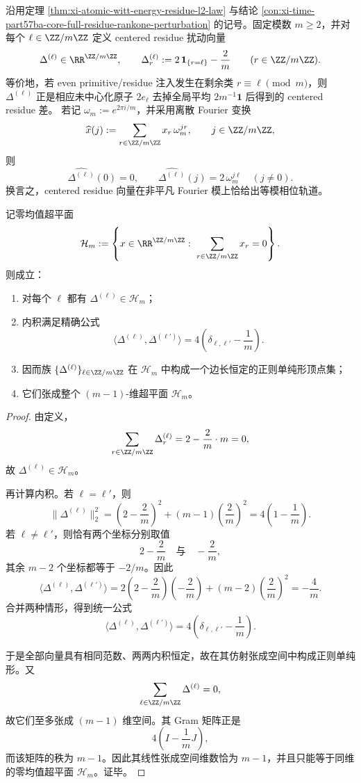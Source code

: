 \begin{theorem}\label{thm:xi-time-part65c-atomic-centered-residue-simplex}
沿用定理 \ref{thm:xi-atomic-witt-energy-residue-l2-law} 与结论 \ref{con:xi-time-part57ba-core-full-residue-rankone-perturbation} 的记号。固定模数 \(m\ge 2\)，并对每个 \(\ell\in \ZZ/m\ZZ\) 定义 centered residue 扰动向量
\[
\Delta^{(\ell)}\in\RR^{\ZZ/m\ZZ},
\qquad
\Delta^{(\ell)}_r:=2\,\mathbf 1_{\{r=\ell\}}-\frac{2}{m}
\qquad (r\in\ZZ/m\ZZ).
\]
等价地，若 even primitive/residue 注入发生在剩余类 \(r\equiv \ell\pmod m\)，则 \(\Delta^{(\ell)}\) 正是相应未中心化原子 \(2e_\ell\) 去掉全局平均 \(2m^{-1}\mathbf 1\) 后得到的 centered residue 差。
若记 \(\omega_m:=e^{2\pi i/m}\)，并采用离散 Fourier 变换
\[
\widehat x(j):=\sum_{r\in\ZZ/m\ZZ}x_r\,\omega_m^{jr},
\qquad j\in\ZZ/m\ZZ,
\]
则
\[
\widehat{\Delta^{(\ell)}}(0)=0,
\qquad
\widehat{\Delta^{(\ell)}}(j)=2\,\omega_m^{j\ell}
\quad (j\neq 0).
\]
换言之，centered residue 向量在非平凡 Fourier 模上恰给出等模相位轨道。

记零均值超平面
\[
\mathcal H_m:=\left\{x\in\RR^{\ZZ/m\ZZ}:\ \sum_{r\in\ZZ/m\ZZ}x_r=0\right\}.
\]
则成立：
\begin{enumerate}
  \item 对每个 \(\ell\) 都有 \(\Delta^{(\ell)}\in\mathcal H_m\)；
  \item 内积满足精确公式
  \[
  \boxed{\;
  \bigl\langle \Delta^{(\ell)},\Delta^{(\ell')}\bigr\rangle
  =
  4\left(\delta_{\ell,\ell'}-\frac{1}{m}\right).\;}
  \]
  \item 因而族 \(\{\Delta^{(\ell)}\}_{\ell\in\ZZ/m\ZZ}\) 在 \(\mathcal H_m\) 中构成一个边长恒定的正则单纯形顶点集；
  \item 它们张成整个 \((m-1)\)-维超平面 \(\mathcal H_m\)。
\end{enumerate}
\end{theorem}
\begin{proof}
由定义，
\[
\sum_{r\in\ZZ/m\ZZ}\Delta_r^{(\ell)}
=
2-\frac{2}{m}\cdot m
=
0,
\]
故 \(\Delta^{(\ell)}\in\mathcal H_m\)。

再计算内积。若 \(\ell=\ell'\)，则
\[
\bigl\|\Delta^{(\ell)}\bigr\|_2^2
=
\left(2-\frac{2}{m}\right)^2
+(m-1)\left(\frac{2}{m}\right)^2
=
4\left(1-\frac{1}{m}\right).
\]
若 \(\ell\neq \ell'\)，则恰有两个坐标分别取值
\[
2-\frac{2}{m}
\quad\text{与}\quad
-\frac{2}{m},
\]
其余 \(m-2\) 个坐标都等于 \(-2/m\)。因此
\[
\bigl\langle \Delta^{(\ell)},\Delta^{(\ell')}\bigr\rangle
=
2\left(2-\frac{2}{m}\right)\left(-\frac{2}{m}\right)
+(m-2)\left(\frac{2}{m}\right)^2
=
-\frac{4}{m}.
\]
合并两种情形，得到统一公式
\[
\bigl\langle \Delta^{(\ell)},\Delta^{(\ell')}\bigr\rangle
=
4\left(\delta_{\ell,\ell'}-\frac{1}{m}\right).
\]

于是全部向量具有相同范数、两两内积恒定，故在其仿射张成空间中构成正则单纯形。又
\[
\sum_{\ell\in\ZZ/m\ZZ}\Delta^{(\ell)}=0,
\]
故它们至多张成 \((m-1)\) 维空间。其 Gram 矩阵正是
\[
4\left(I-\frac{1}{m}J\right),
\]
而该矩阵的秩为 \(m-1\)。因此其线性张成空间维数恰为 \(m-1\)，并且只能等于同维的零均值超平面 \(\mathcal H_m\)。证毕。
\end{proof}

